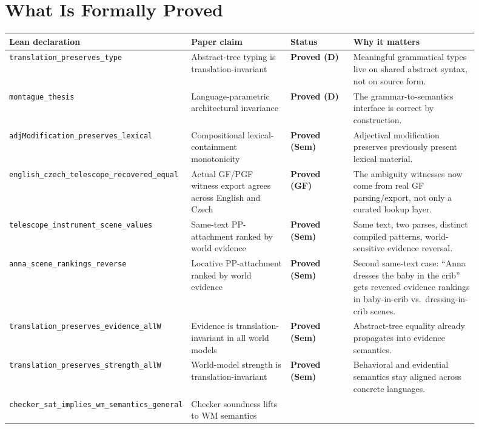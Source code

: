 \documentclass[11pt]{article}
\newcommand{\code}[1]{\texttt{#1}}
\begin{document}
\section*{What Is Formally Proved}
\begin{center}
\small
\begin{tabular}{@{}p{0.26\linewidth}p{0.22\linewidth}p{0.14\linewidth}p{0.28\linewidth}@{}}
\toprule
\textbf{Lean declaration} & \textbf{Paper claim} & \textbf{Status} & \textbf{Why it matters} \\
\midrule
\code{translation\_preserves\_type} &
Abstract-tree typing is translation-invariant &
\textbf{Proved (D)} &
Meaningful grammatical types live on shared abstract syntax, not on source form. \\
\code{montague\_thesis} &
Language-parametric architectural invariance &
\textbf{Proved (D)} &
The grammar-to-semantics interface is correct by construction. \\
\code{adjModification\_preserves\_lexical} &
Compositional lexical-containment monotonicity &
\textbf{Proved (Sem)} &
Adjectival modification preserves previously present lexical material. \\
\code{english\_czech\_telescope\_recovered\_equal} &
Actual GF/PGF witness export agrees across English and Czech &
\textbf{Proved (GF)} &
The ambiguity witnesses now come from real GF parsing/export, not only a curated lookup layer. \\
\code{telescope\_instrument\_scene\_values} &
Same-text PP-attachment ranked by world evidence &
\textbf{Proved (Sem)} &
Same text, two parses, distinct compiled patterns, world-sensitive evidence reversal. \\
\code{anna\_scene\_rankings\_reverse} &
Locative PP-attachment ranked by world evidence &
\textbf{Proved (Sem)} &
Second same-text case: ``Anna dresses the baby in the crib'' gets reversed
evidence rankings in baby-in-crib vs.\ dressing-in-crib scenes. \\
\code{translation\_preserves\_evidence\_allW} &
Evidence is translation-invariant in all world models &
\textbf{Proved (Sem)} &
Abstract-tree equality already propagates into evidence semantics. \\
\code{translation\_preserves\_strength\_allW} &
World-model strength is translation-invariant &
\textbf{Proved (Sem)} &
Behavioral and evidential semantics stay aligned across concrete languages. \\
\code{checker\_sat\_implies\_wm\_semantics\_general} &
Checker soundness lifts to WM semantics &

\end{tabular}
\end{center}
\end{document}
